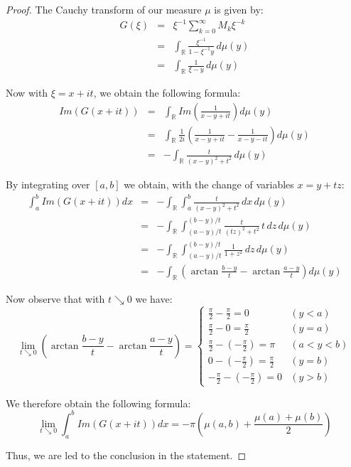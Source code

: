 \documentclass[12pt]{amsbook}
\begin{document}
\begin{proof}
The Cauchy transform of our measure $\mu$ is given by:
\begin{eqnarray*}
G(\xi)
&=&\xi^{-1}\sum_{k=0}^\infty M_k\xi^{-k}\\\
&=&\int_\mathbb R\frac{\xi^{-1}}{1-\xi^{-1}y}\,d\mu(y)\\
&=&\int_\mathbb R\frac{1}{\xi-y}\,d\mu(y)
\end{eqnarray*}

Now with $\xi=x+it$, we obtain the following formula:
\begin{eqnarray*}
Im(G(x+it))
&=&\int_\mathbb RIm\left(\frac{1}{x-y+it}\right)d\mu(y)\\
&=&\int_\mathbb R\frac{1}{2i}\left(\frac{1}{x-y+it}-\frac{1}{x-y-it}\right)d\mu(y)\\
&=&-\int_\mathbb R\frac{t}{(x-y)^2+t^2}\,d\mu(y)
\end{eqnarray*}

By integrating over $[a,b]$ we obtain, with the change of variables $x=y+tz$:
\begin{eqnarray*}
\int_a^bIm(G(x+it))dx
&=&-\int_\mathbb R\int_a^b\frac{t}{(x-y)^2+t^2}\,dx\,d\mu(y)\\
&=&-\int_\mathbb R\int_{(a-y)/t}^{(b-y)/t}\frac{t}{(tz)^2+t^2}\,t\,dz\,d\mu(y)\\
&=&-\int_\mathbb R\int_{(a-y)/t}^{(b-y)/t}\frac{1}{1+z^2}\,dz\,d\mu(y)\\
&=&-\int_\mathbb R\left(\arctan\frac{b-y}{t}-\arctan\frac{a-y}{t}\right)d\mu(y)
\end{eqnarray*}

Now observe that with $t\searrow0$ we have:
$$\lim_{t\searrow0}\left(\arctan\frac{b-y}{t}-\arctan\frac{a-y}{t}\right)
=\begin{cases}
\frac{\pi}{2}-\frac{\pi}{2}=0& (y<a)\\
\frac{\pi}{2}-0=\frac{\pi}{2}& (y=a)\\
\frac{\pi}{2}-(-\frac{\pi}{2})=\pi& (a<y<b)\\
0-(-\frac{\pi}{2})=\frac{\pi}{2}& (y=b)\\
-\frac{\pi}{2}-(-\frac{\pi}{2})=0& (y>b)
\end{cases}$$

We therefore obtain the following formula:
$$\lim_{t\searrow0}\int_a^bIm(G(x+it))dx=-\pi\left(\mu(a,b)+\frac{\mu(a)+\mu(b)}{2}\right)$$

Thus, we are led to the conclusion in the statement.
\end{proof}
\end{document}
